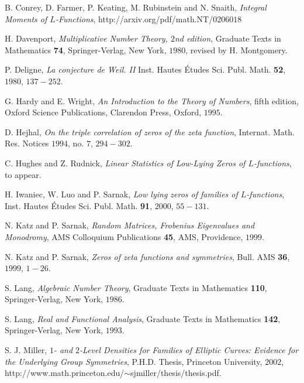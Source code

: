\documentclass{compositio}
\begin{document}
\begin{thebibliography}{PTW02} %


\newblock B. Conrey, D. Farmer, P. Keating, M. Rubinstein and N.
Snaith, \emph{Integral Moments of $L$-Functions},
http://arxiv.org/pdf/math.NT/$0206018$

\newblock H. Davenport, \emph{Multiplicative Number Theory, $2$nd edition},
 Graduate Texts in Mathematics \textbf{74}, Springer-Verlag, New York,
 $1980$, revised by H. Montgomery.

\newblock P. Deligne, \emph{La conjecture de Weil. II} Inst. Hautes \'Etudes
Sci. Publ. Math. \textbf{52}, $1980$, $137-252$.

\newblock G. Hardy and E. Wright, \emph{An Introduction to the
Theory of Numbers}, fifth edition, Oxford Science Publications,
Clarendon Press, Oxford, $1995$.

\newblock D. Hejhal, \emph{On the triple correlation of zeros of
the zeta function}, Internat. Math. Res. Notices $1994$, no. $7$,
$294-302$.

\newblock C. Hughes and Z. Rudnick, \emph{Linear Statistics of
Low-Lying Zeros of $L$-functions}, to appear.

\newblock H. Iwaniec, W. Luo and P. Sarnak, \emph{Low lying zeros of
families of $L$-functions}, Inst. Hautes \'Etudes Sci. Publ. Math.
\textbf{91}, $2000$, $55-131$.

\newblock N. Katz and P. Sarnak, \emph{Random Matrices, Frobenius
Eigenvalues and Monodromy}, AMS Colloquium Publications
\textbf{45}, AMS, Providence, $1999$.

\newblock N. Katz and P. Sarnak, \emph{Zeros of zeta functions and symmetries},
Bull. AMS \textbf{36}, $1999$, $1-26$.

\newblock S. Lang, \emph{Algebraic Number Theory}, Graduate Texts in
Mathematics \textbf{110}, Springer-Verlag, New York, $1986$.

\newblock S. Lang, \emph{Real and Functional Analysis}, Graduate Texts in
Mathematics \textbf{142}, Springer-Verlag, New York, $1993$.

\newblock S. J. Miller, \emph{$1$- and $2$-Level Densities for Families of Elliptic
Curves: Evidence for the Underlying Group Symmetries}, P.H.D.
Thesis, Princeton University, $2002$,
http://www.math.princeton.edu/$\sim$sjmiller/thesis/thesis.pdf.


\end{thebibliography}
\end{document}
